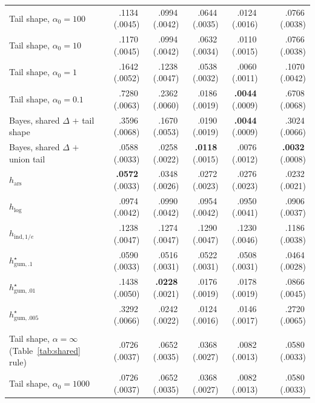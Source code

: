 \documentclass[11pt]{article}
\newcommand{\mcse}[2]{\mbox{#1\,{\fontsize{7}{8}\selectfont(#2)}}}
\newcommand{\bestmcse}[2]{\mbox{\textbf{#1}\,{\fontsize{7}{8}\selectfont(#2)}}}
\begin{document}
\begin{table}[p]
\begin{tabular}{@{}lrrrrcr@{}}
Tail shape, $\alpha_0=100$ & \mcse{.1134}{.0045} & \mcse{.0994}{.0042} & \mcse{.0644}{.0035} & \mcse{.0124}{.0016} & & \mcse{.0766}{.0038} \\
Tail shape, $\alpha_0=10$ & \mcse{.1170}{.0045} & \mcse{.0994}{.0042} & \mcse{.0632}{.0034} & \mcse{.0110}{.0015} & & \mcse{.0766}{.0038} \\
Tail shape, $\alpha_0=1$ & \mcse{.1642}{.0052} & \mcse{.1238}{.0047} & \mcse{.0538}{.0032} & \mcse{.0060}{.0011} & & \mcse{.1070}{.0042} \\
Tail shape, $\alpha_0=0.1$ & \mcse{.7280}{.0063} & \mcse{.2362}{.0060} & \mcse{.0186}{.0019} & \bestmcse{.0044}{.0009} & & \mcse{.6708}{.0068} \\
Bayes, shared $\Delta$ $+$ tail shape & \mcse{.3596}{.0068} & \mcse{.1670}{.0053} & \mcse{.0190}{.0019} & \bestmcse{.0044}{.0009} & & \mcse{.3024}{.0066} \\
Bayes, shared $\Delta$ $+$ union tail & \mcse{.0588}{.0033} & \mcse{.0258}{.0022} & \bestmcse{.0118}{.0015} & \mcse{.0076}{.0012} & & \bestmcse{.0032}{.0008} \\
\addlinespace[1pt]
$h_{\mathrm{ars}}$ & \bestmcse{.0572}{.0033} & \mcse{.0348}{.0026} & \mcse{.0272}{.0023} & \mcse{.0276}{.0023} & & \mcse{.0232}{.0021} \\
$h_{\log}$ & \mcse{.0974}{.0042} & \mcse{.0990}{.0042} & \mcse{.0954}{.0042} & \mcse{.0950}{.0041} & & \mcse{.0906}{.0037} \\
$h_{\mathrm{ind},1/e}$ & \mcse{.1238}{.0047} & \mcse{.1274}{.0047} & \mcse{.1290}{.0047} & \mcse{.1230}{.0046} & & \mcse{.1186}{.0038} \\
$h^\star_{\mathrm{gum},.1}$ & \mcse{.0590}{.0033} & \mcse{.0516}{.0031} & \mcse{.0522}{.0031} & \mcse{.0508}{.0031} & & \mcse{.0464}{.0028} \\
$h^\star_{\mathrm{gum},.01}$ & \mcse{.1438}{.0050} & \bestmcse{.0228}{.0021} & \mcse{.0176}{.0019} & \mcse{.0178}{.0019} & & \mcse{.0866}{.0045} \\
$h^\star_{\mathrm{gum},.005}$ & \mcse{.3292}{.0066} & \mcse{.0242}{.0022} & \mcse{.0124}{.0016} & \mcse{.0146}{.0017} & & \mcse{.2720}{.0065} \\
\addlinespace[1pt]
\multicolumn{7}{@{}l}{\textit{Horizon $n=700$}}\\
Tail shape, $\alpha=\infty$ (Table~\ref{tab:shared} rule) & \mcse{.0726}{.0037} & \mcse{.0652}{.0035} & \mcse{.0368}{.0027} & \mcse{.0082}{.0013} & & \mcse{.0580}{.0033} \\
Tail shape, $\alpha_0=1000$ & \mcse{.0726}{.0037} & \mcse{.0652}{.0035} & \mcse{.0368}{.0027} & \mcse{.0082}{.0013} & & \mcse{.0580}{.0033} \\

\end{tabular}
\end{table}
\end{document}
